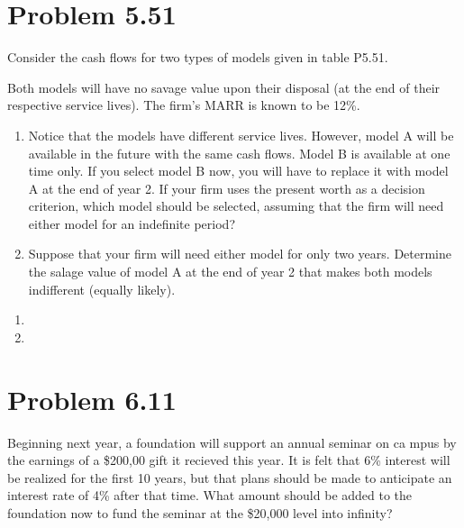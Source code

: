 \documentclass[../INDE250HW.tex]{subfiles}
\begin{document}
\section*{Problem 5.51}
\begin{exmp}
    Consider the cash flows for two types of models given in table P5.51. 

    Both models will have no savage value upon their disposal (at the end of their respective service lives). The firm's MARR is known to be 12\%.

    \begin{enumerate}
        \item Notice that the models have different service lives. However, model A will be available in the future with the same cash flows. Model B is available at one time only. If you select model B now, you will have to replace it with model A at the end of year 2. If your firm uses the present worth as a decision criterion, which model should be selected, assuming that the firm will need either model for an indefinite period?
        \item Suppose that your firm will need either model for only two years. Determine the salage value of model A at the end of year 2 that makes both models indifferent (equally likely).
    \end{enumerate}
\end{exmp}
\begin{enumerate}
    \item {}
    \item {}
\end{enumerate}

\section*{Problem 6.11}
\begin{exmp}
    Beginning next year, a foundation will support an annual seminar on ca mpus by the earnings of a \$200,00 gift it recieved this year. It is felt that 6\% interest will be realized for the first 10 years, but that plans should be made to anticipate an interest rate of 4\% after that time. What amount should be added to the foundation now to fund the seminar at the \$20,000 level into infinity?
\end{exmp}
\begin{center}
\end{center}
\end{document}
